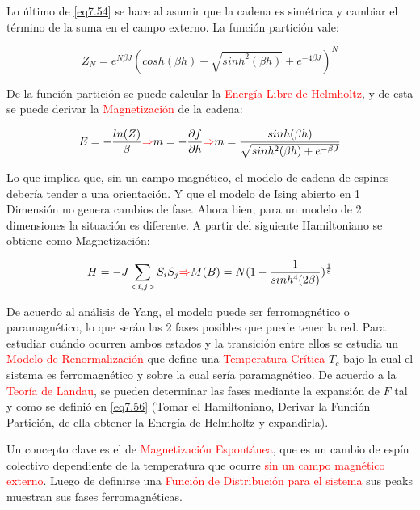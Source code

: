 \documentclass{book}
\begin{document}
Lo último de \ref{eq7.54} se hace al asumir que la cadena es simétrica y cambiar el término de la suma en el campo externo. La función partición vale:

\begin{equation}\label{eq7.55}Z_N=e^{N\beta J}(cosh(\beta h)+\sqrt{sinh^2(\beta h)}+e^{-4\beta J})^N\end{equation}

De la función partición se puede calcular la \textcolor{red}{Energía Libre de Helmholtz}, y de esta se puede derivar la \textcolor{red}{Magnetización} de la cadena:

\begin{equation}\label{eq7.56}E=-\frac{ln(Z)}{\beta}\textcolor{red}{\Rightarrow} m=-\frac{\partial f}{\partial h}\textcolor{red}{\Rightarrow} m=\frac{sinh(\beta h)}{\sqrt{sinh^2(\beta h)+e^{-\beta J}}}\end{equation}

Lo que implica que, sin un campo magnético, el modelo de cadena de espines debería tender a una orientación. Y que el modelo de Ising abierto en 1 Dimensión no genera cambios de fase. Ahora bien, para un modelo de 2 dimensiones la situación es diferente. A partir del siguiente Hamiltoniano se obtiene como Magnetización:

\begin{equation}\label{eq7.57}H=-J\sum_{<i,j>}S_iS_j \textcolor{red}{\Rightarrow} M(B)=N(1-\frac{1}{sinh^4(2\beta)})^{\frac{1}{8}}\end{equation}

De acuerdo al análisis de Yang, el modelo puede ser ferromagnético o paramagnético, lo que serán las 2 fases posibles que puede tener la red. Para estudiar cuándo ocurren ambos estados y la transición entre ellos se estudia un \textcolor{red}{Modelo de Renormalización} que define una \textcolor{red}{Temperatura Crítica} $T_c$ bajo la cual el sistema es ferromagnético y sobre la cual sería paramagnético. De acuerdo a la \textcolor{red}{Teoría de Landau}, se pueden determinar las fases mediante la expansión de $F$ tal y como se definió en \ref{eq7.56} (Tomar el Hamiltoniano, Derivar la Función Partición, de ella obtener la Energía de Helmholtz y expandirla).

Un concepto clave es el de \textcolor{red}{Magnetización Espontánea}, que es un cambio de espín colectivo dependiente de la temperatura que ocurre \textcolor{red}{sin un campo magnético externo}. Luego de definirse una \textcolor{red}{Función de Distribución para el sistema} sus peaks muestran sus fases ferromagnéticas. 
\end{document}
